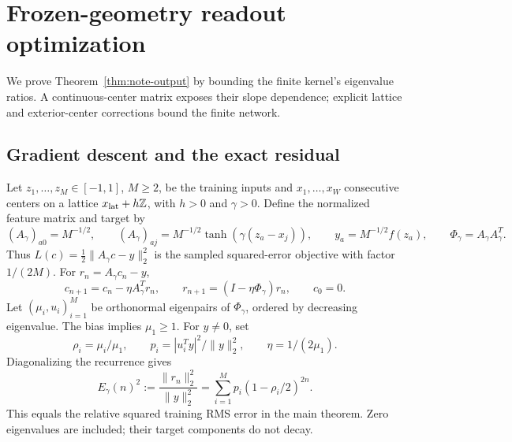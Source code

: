 \section{Frozen-geometry readout optimization}
\label{app:note-spectrum}

We prove Theorem~\ref{thm:note-output} by bounding the finite kernel's
eigenvalue ratios. A continuous-center matrix exposes their slope dependence;
explicit lattice and exterior-center corrections bound the finite network.

\subsection{Gradient descent and the exact residual}
Let $z_1,\ldots,z_M\in[-1,1]$, $M\ge2$, be the training inputs and
$x_1,\ldots,x_W$ consecutive centers on a lattice $x_{\rm lat}+h\mathbb Z$,
with $h>0$ and $\gamma>0$. Define the normalized feature matrix and target by
\begin{equation}
 (A_\gamma)_{a0}=M^{-1/2},\qquad
 (A_\gamma)_{aj}=M^{-1/2}\tanh(\gamma(z_a-x_j)),\qquad
 y_a=M^{-1/2}f(z_a),\qquad \Phi_\gamma=A_\gamma A_\gamma^T.
 \label{eq:note-feature-definition}
\end{equation}
Thus $L(c)=\tfrac12\|A_\gamma c-y\|_2^2$ is the sampled squared-error
objective with factor $1/(2M)$. For $r_n=A_\gamma c_n-y$,
\begin{equation}
 c_{n+1}=c_n-\eta A_\gamma^Tr_n,
 \qquad r_{n+1}=(I-\eta\Phi_\gamma)r_n,
 \qquad c_0=0.
 \label{eq:note-residual-recurrence}
\end{equation}
Let $(\mu_i,u_i)_{i=1}^M$ be orthonormal eigenpairs of $\Phi_\gamma$,
ordered by decreasing eigenvalue. The bias implies $\mu_1\ge1$.
For $y\ne0$, set
\begin{equation}
 \rho_i=\mu_i/\mu_1,\qquad
 p_i=|u_i^Ty|^2/\|y\|_2^2,\qquad \eta=1/(2\mu_1).
 \label{eq:note-target-weights}
\end{equation}
Diagonalizing the recurrence gives
\begin{equation}
 E_\gamma(n)^2:=\frac{\|r_n\|_2^2}{\|y\|_2^2}
 =\sum_{i=1}^M p_i(1-\rho_i/2)^{2n}.
 \label{eq:note-exact-spectral-error}
\end{equation}
This equals the relative squared training RMS error in the main theorem.
Zero eigenvalues are included; their target components do not decay.

